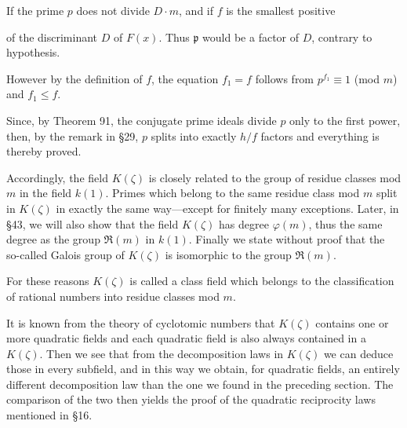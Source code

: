If the prime $p$ does not divide $D \cdot m$, and if $f$ is the smallest positive

of the discriminant $D$ of $F(x)$. Thus $\mathfrak{p}$ would be a factor of $D$, contrary to hypothesis.

However by the definition of $f$, the equation $f_1 = f$ follows from $p^{f_1} \equiv 1$ (mod $m$) and $f_1 \leq f$.

Since, by Theorem 91, the conjugate prime ideals divide $p$ only to the first power, then, by the remark in §29, $p$ splits into exactly $h/f$ factors and everything is thereby proved.

Accordingly, the field $K(\zeta)$ is closely related to the group of residue classes mod $m$ in the field $k(1)$. Primes which belong to the same residue class mod $m$ split in $K(\zeta)$ in exactly the same way—except for finitely many exceptions. Later, in §43, we will also show that the field $K(\zeta)$ has degree $\varphi(m)$, thus the same degree as the group $\Re(m)$ in $k(1)$. Finally we state without proof that the so-called Galois group of $K(\zeta)$ is isomorphic to the group $\Re(m)$.

For these reasons $K(\zeta)$ is called a class field which belongs to the classification of rational numbers into residue classes mod $m$.

It is known from the theory of cyclotomic numbers that $K(\zeta)$ contains one or more quadratic fields and each quadratic field is also always contained in a $K(\zeta)$. Then we see that from the decomposition laws in $K(\zeta)$ we can deduce those in every subfield, and in this way we obtain, for quadratic fields, an entirely different decomposition law than the one we found in the preceding section. The comparison of the two then yields the proof of the quadratic reciprocity laws mentioned in §16.
